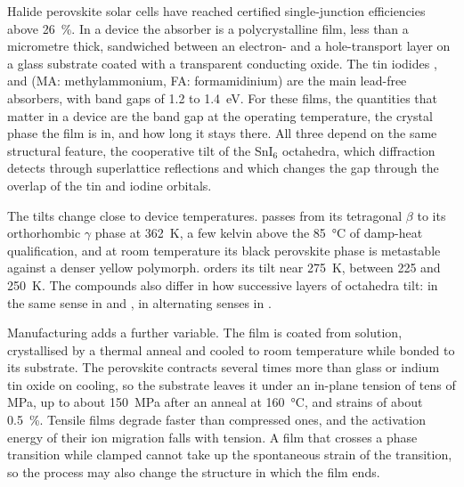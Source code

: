 
Halide perovskite solar cells have reached certified single-junction efficiencies above
\SI{26}{\percent}.\cite{ref_efficiency} In a device the absorber is a polycrystalline film, less than a micrometre
thick, sandwiched between an electron- and a hole-transport layer on a glass substrate coated with a transparent
conducting oxide. The tin iodides \CsSnI{}, \MASnI{} and \FASnI{} (MA: methylammonium, FA: formamidinium) are the main
lead-free absorbers, with band gaps of 1.2 to \SI{1.4}{eV}.\cite{pitaro2022tin, stoumpos2013semiconducting} For these
films, the quantities that matter in a device are the band gap at the operating temperature, the crystal phase the film
is in, and how long it stays there. All three depend on the same structural feature, the cooperative tilt of the
SnI$_6$ octahedra, which diffraction detects through superlattice reflections and which changes the gap through the
overlap of the tin and iodine orbitals.\cite{huang2013electronic}

The tilts change close to device temperatures. \CsSnI{} passes from its tetragonal $\beta$ to its orthorhombic $\gamma$
phase at \SI{362}{K}, a few kelvin above the \SI{85}{\celsius} of damp-heat qualification, and at room temperature its
black perovskite phase is metastable against a denser yellow polymorph.\cite{Chung2012JACS} \MASnI{} orders its tilt
near \SI{275}{K},\cite{Yamada2011BCSJ, Takahashi2011Dalton, Parrott2016JPCL, stoumpos2013semiconducting} \FASnI{}
between 225 and \SI{250}{K}.\cite{schueller2018crystal} The compounds also differ in how successive layers of octahedra
tilt: in the same sense in \CsSnI{} and \FASnI{}, in alternating senses in
\MASnI{}.\cite{Chung2012JACS, Kahmann2020ACSEL, stoumpos2013semiconducting}

Manufacturing adds a further variable. The film is coated from solution, crystallised by a thermal anneal and cooled
to room temperature while bonded to its substrate.\cite{StrainReview, yang2022strain} The perovskite contracts several
times more than glass or indium tin oxide on cooling,\cite{Steele2019Science} so the substrate leaves it under an
in-plane tension of tens of MPa, up to about \SI{150}{MPa} after an anneal at \SI{160}{\celsius}, and strains of about
\SI{0.5}{\percent}.\cite{Rolston2018AEM, Zhao2017SciAdv, ref_processing_temp} Tensile films degrade faster than
compressed ones, and the activation energy of their ion migration falls with tension.\cite{Zhao2017SciAdv,
ref_processing_temp} A film that crosses a phase transition while clamped cannot take up the spontaneous strain of the
transition, so the process may also change the structure in which the film ends.

